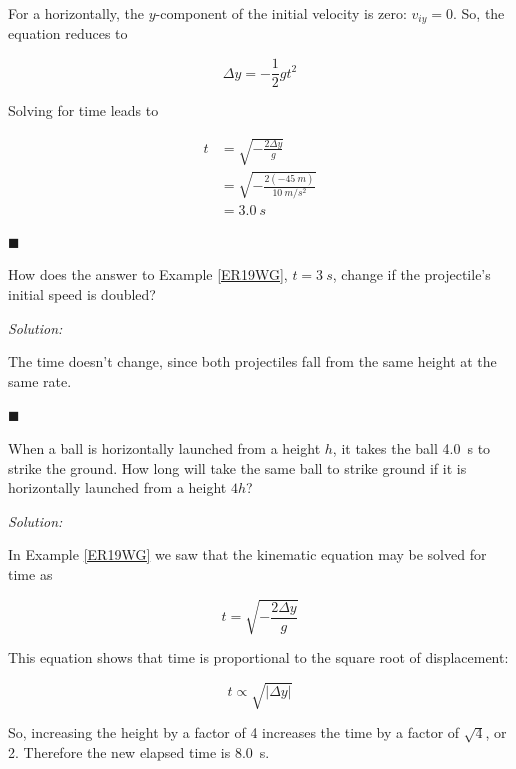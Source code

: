\documentclass[dvipsnames]{article}
\begin{document}
For a horizontally, the $y$-component of the initial velocity is zero: $v_{iy} = 0$. So, the equation reduces to

\begin{equation*}
    \Delta y = -\frac{1}{2}gt^2
\end{equation*}

Solving for time leads to

\begin{align*}
    t &= \sqrt{-\frac{2\Delta y}{g}} \\[1ex]
    &= \sqrt{-\frac{2(-\SI{45}{m})}{\SI{10}{m/s^2}}} \\[1ex]
    &= \boxed{\SI{3.0}{s}}
\end{align*}

\hfill $\blacksquare$

\begin{example} \label{ADuHT8}
    How does the answer to Example \ref{ER19WG}, $t=\SI{3}{s}$, change if the projectile's initial speed is doubled?
\end{example}

\textit{Solution:}

The time doesn't change, since both projectiles fall from the same height at the same rate.

\hfill $\blacksquare$

\begin{example} \label{mT7mjd}
    When a ball is horizontally launched from a height $h$, it takes the ball \SI{4.0}{s} to strike the ground. How long will take the same ball to strike ground if it is horizontally launched from a height $4h$?
\end{example}

\textit{Solution:}

In Example \ref{ER19WG} we saw that the kinematic equation may be solved for time as

\begin{equation*}
    t = \sqrt{-\frac{2\Delta y}{g}}
\end{equation*}

This equation shows that time is proportional to the square root of displacement:

\begin{equation*}
    t \propto \sqrt{\left|\Delta y\right|}
\end{equation*}

So, increasing the height by a factor of 4 increases the time by a factor of $\sqrt{4}$, or 2. Therefore the new elapsed time is \SI{8.0}{s}.
\end{document}
